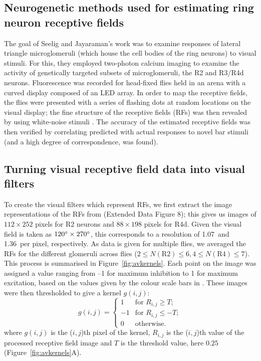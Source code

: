 \subsection*{Neurogenetic methods used for estimating ring neuron receptive fields}
\label{sec:methods:seelig}
The goal of Seelig and Jayaraman's \cite{Seelig2013} work was to examine responses of lateral triangle microglomeruli (which house the cell bodies of the ring neurons) to visual stimuli.
For this, they employed two-photon calcium imaging to examine the activity of genetically targeted subsets of microglomeruli, the R2 and R3/R4d neurons.
Fluorescence was recorded for head-fixed flies held in an arena with a curved display composed of an LED array.
In order to map the receptive fields, the flies were presented with a series of flashing dots at random locations on the visual display; the fine structure of the receptive fields (RFs) was then revealed by using white-noise stimuli \cite{Weber2010}.
The accuracy of the estimated receptive fields was then verified by correlating predicted with actual responses to novel bar stimuli (and a high degree of correspondence, was found).

\subsection*{Turning visual receptive field data into visual filters}
\label{sec:methods:preprocessing}
To create the visual filters which represent RFs, we first extract the image representations of the RFs from \cite{Seelig2013} (Extended Data Figure 8); this gives us images of $112\times 252$ pixels for R2 neurons and $88\times 198$ pixels for R4d.
Given the visual field is taken as $120\degree\times 270\degree$, this corresponds to a resolution of 1.07\degree\ and 1.36\degree\ per pixel, respectively.
As data is given for multiple flies, we averaged the RFs for the different glomeruli across flies ($2\le N(\mathrm{R2}) \le 6, 4\le N(\mathrm{R4})\le 7$). This process is summarised in Figure~\ref{fig:avkernels}. Each point on the image was assigned a value ranging from --1 for maximum inhibition to 1 for maximum excitation, based on the values given by the colour scale bars in \cite{Seelig2013}.
These images were then thresholded to give a kernel $g(i,j)$:
$$
g(i,j) = \left\{ \begin{array}{rl}
1 & \mbox{for } R_{i,j} \ge T; \\
-1 & \mbox{for } R_{i,j} \le -T; \\
0 & \mbox{otherwise.}
\end{array}
\right.
$$
where $g(i,j)$ is the ($i,j$)th pixel of the kernel, $R_{i,j}$ is the ($i,j$)th value of the processed receptive field image and $T$ is the threshold value, here $0.25$ (Figure~\ref{fig:avkernels}A).

